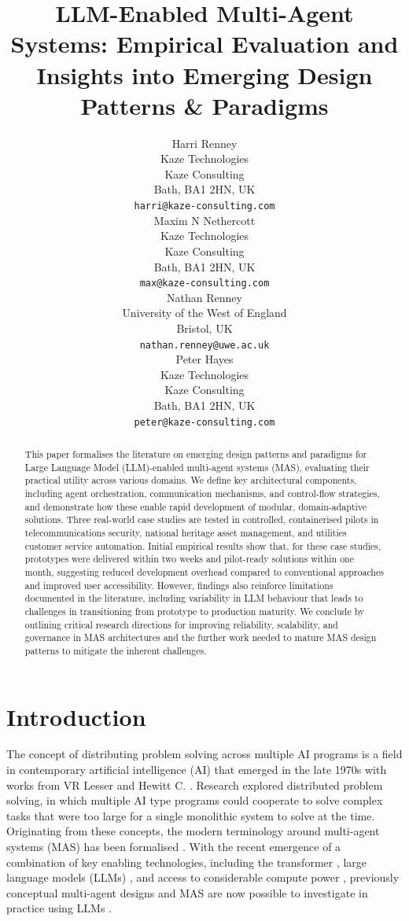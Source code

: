 \documentclass{article}
\title{LLM-Enabled Multi-Agent Systems: Empirical Evaluation and Insights into Emerging Design Patterns \& Paradigms}
\author{
 Harri Renney \\
  Kaze Technologies\\
  Kaze Consulting\\
  Bath, BA1 2HN, UK \\
  \texttt{harri@kaze-consulting.com} \\
   \And
 Maxim N Nethercott \\
  Kaze Technologies\\
  Kaze Consulting\\
  Bath, BA1 2HN, UK \\
  \texttt{max@kaze-consulting.com} \\
  \And
Nathan Renney \\
  University of the West of England\\
  Bristol, UK \\
  \texttt{nathan.renney@uwe.ac.uk} \\
  \And
  Peter Hayes \\
  Kaze Technologies\\
  Kaze Consulting\\
  Bath, BA1 2HN, UK \\
  \texttt{peter@kaze-consulting.com} \\
}
\begin{document}
\maketitle
\begin{abstract}
This paper formalises the literature on emerging design patterns and paradigms for Large Language Model (LLM)-enabled multi-agent systems (MAS), evaluating their practical utility across various domains. We define key architectural components, including agent orchestration, communication mechanisms, and control-flow strategies, and demonstrate how these enable rapid development of modular, domain-adaptive solutions. Three real-world case studies are tested in controlled, containerised pilots in telecommunications security, national heritage asset management, and utilities customer service automation. Initial empirical results show that, for these case studies, prototypes were delivered within two weeks and pilot-ready solutions within one month, suggesting reduced development overhead compared to conventional approaches and improved user accessibility. However, findings also reinforce limitations documented in the literature, including variability in LLM behaviour that leads to challenges in transitioning from prototype to production maturity. We conclude by outlining critical research directions for improving reliability, scalability, and governance in MAS architectures and the further work needed to mature MAS design patterns to mitigate the inherent challenges.
\end{abstract}




\section{Introduction} \label{sect:s1}

The concept of distributing problem solving across multiple AI programs is a field in contemporary artificial intelligence (AI) that emerged in the late 1970s with works from VR Lesser \cite{10.5555/1624861.1624983} and Hewitt C. \cite{hewitt1977viewing}. Research explored distributed problem solving, in which multiple AI type programs could cooperate to solve complex tasks that were too large for a single monolithic system to solve at the time. Originating from these concepts, the modern terminology around multi-agent systems (MAS) has been formalised \cite{abbas2015organization, dorri2018multi}. With the  recent emergence of a combination of key enabling technologies, including the transformer \cite{vaswani2017attention}, large language models (LLMs) \cite{naveed2025comprehensive}, and access to considerable compute power \cite{sastry2024computing}, previously conceptual multi-agent designs and MAS are now possible to investigate in practice using LLMs \cite{renney2025reimagining}.
\end{document}
